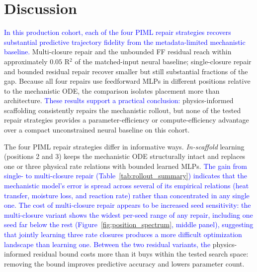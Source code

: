 \documentclass[fleqn,10pt]{wlscirep}
\newcommand{\rev}[1]{\textcolor{blue}{#1}}
\begin{document}
\section*{Discussion}

\rev{In this production cohort, each of the four PIML repair strategies recovers substantial predictive trajectory fidelity from the metadata-limited mechanistic baseline.} Multi-closure repair and the unbounded FF residual reach within approximately $0.05$ R$^2$ of the matched-input neural baseline; single-closure repair and bounded residual repair recover smaller but still substantial fractions of the gap. Because all four repairs use feedforward MLPs in different positions relative to the mechanistic ODE, the comparison isolates placement more than architecture. \rev{These results support a practical conclusion:} physics-informed scaffolding consistently repairs the mechanistic rollout, but none of the tested repair strategies provides a parameter-efficiency or compute-efficiency advantage over a compact unconstrained neural baseline on this cohort.

The four PIML repair strategies differ in informative ways. \emph{In-scaffold} learning (positions 2 and 3) keeps the mechanistic ODE structurally intact and replaces one or three physical rate relations with bounded learned MLPs. \rev{The gain from single- to multi-closure repair (Table~\ref{tab:rollout_summary}) indicates that the mechanistic model's error is spread across several of its empirical relations (heat transfer, moisture loss, and reaction rate) rather than concentrated in any single one.} \rev{The cost of multi-closure repair appears to be increased seed sensitivity: the multi-closure variant shows the widest per-seed range of any repair, including one seed far below the rest (Figure~\ref{fig:position_spectrum}, middle panel), suggesting that jointly learning three rate closures produces a more difficult optimization landscape than learning one.} \rev{Between the two residual variants, the} physics-informed residual bound costs more than it buys within the tested search space: removing the bound improves predictive accuracy and lowers parameter count.
\end{document}
